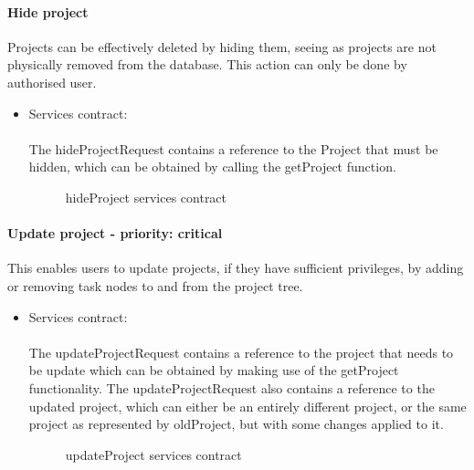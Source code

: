 \paragraph{Hide project}
Projects can be effectively deleted by hiding them, seeing as projects are not physically removed from the database. This action can only be done by authorised user.

\begin{itemize}
	\item Services contract:\\ \\
	The hideProjectRequest contains a reference to the Project that must be hidden, which can be obtained by calling the getProject function.
	\begin{figure}[H]
    	\centering
    	\caption{hideProject services contract}
    	\label{fig:hideProject_services_contract}
   	\end{figure}
\end{itemize}


\paragraph{Update project - priority: critical}
This enables users to update projects, if they have sufficient privileges, by adding or removing task nodes to and from the project tree.

\begin{itemize}
	\item Services contract:\\ \\
	The updateProjectRequest contains a reference to the project that needs to be update which can be obtained by making use of the getProject functionality. The updateProjectRequest also contains a reference to the updated project, which can either be an entirely different project, or the same project as represented by oldProject, but with some changes applied to it.
	\begin{figure}[H]
    	\centering
    	\caption{updateProject services contract}
    	\label{fig:updateProject_services_contract}
   	\end{figure}
\end{itemize}

